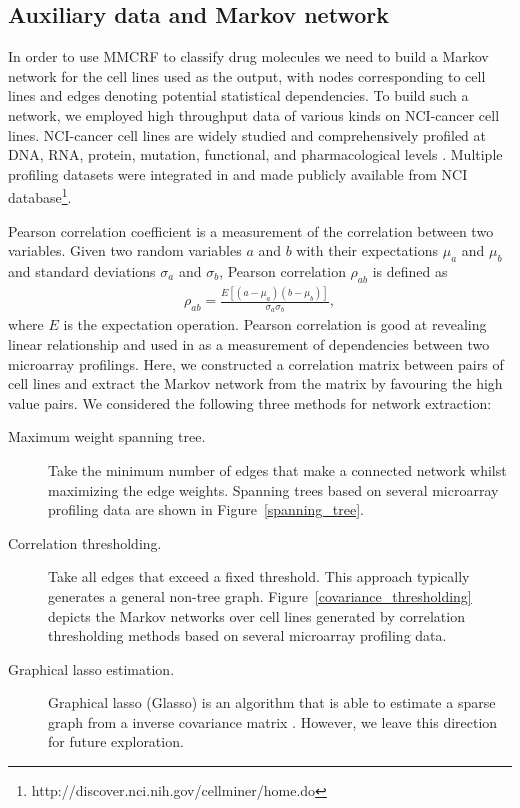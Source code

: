 \documentclass[english]{tktltiki}
\begin{document}
\subsection{Auxiliary data and Markov network}
\label{markov_network_sc}

In order to use MMCRF to classify drug molecules we need to build a Markov network for the cell lines used as the output, with nodes corresponding to cell lines and edges denoting potential statistical dependencies. To build such a network, we employed high throughput data of various kinds on NCI-cancer cell lines. NCI-cancer cell lines are widely studied and comprehensively profiled at DNA, RNA, protein, mutation, functional, and pharmacological levels \cite{lorenzi09, shankavaram07}. Multiple profiling datasets were integrated in \cite{shankavaram09} and made publicly available from NCI database\footnote{http://discover.nci.nih.gov/cellminer/home.do}.

Pearson correlation coefficient is a measurement of the correlation between two variables. Given two random variables $a$ and $b$ with their expectations $\mu_a$ and $\mu_b$ and standard deviations $\sigma_a$ and $\sigma_b$, Pearson correlation $\rho_{ab}$ is defined as
\begin{align*}
\rho_{ab} = \frac{E[(a-\mu_a)(b-\mu_b)]}{\sigma_a\sigma_b},
\end{align*}
where $E$ is the expectation operation. Pearson correlation is good at revealing linear relationship and used in \cite{huang10} as a measurement of dependencies between two microarray profilings. Here, we constructed a correlation matrix between pairs of cell lines and extract the Markov network from the matrix by favouring the high value pairs. We considered the following three methods for network extraction:

\begin{description}
\item[Maximum weight spanning tree.] Take the minimum number of edges that make a connected network whilst maximizing the edge weights. Spanning trees based on several microarray profiling data are shown in Figure~\ref{spanning_tree}.

\item[Correlation thresholding.] Take all edges that exceed a fixed threshold. This approach typically generates a general non-tree graph. Figure~\ref{covariance_thresholding} depicts the Markov networks over cell lines generated by correlation thresholding methods based on several microarray profiling data.

\item[Graphical lasso estimation.] Graphical lasso (Glasso) is an algorithm that is able to estimate a sparse graph from a inverse covariance matrix \cite{friedman08}. However, we leave this direction for future exploration. 
\end{description}
\end{document}
